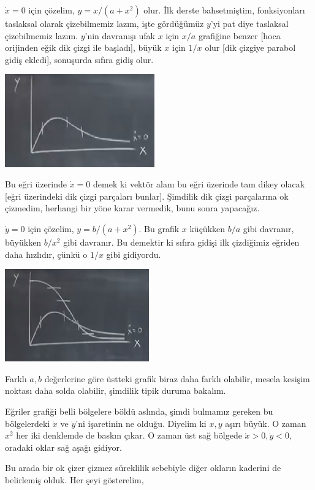 \documentclass[12pt,fleqn]{article}\usepackage{../../common}
\begin{document}
$\dot{x}=0$ için çözelim, $y = x / (a+x^2)$ olur. İlk derste bahsetmiştim,
fonksiyonları taslaksal olarak çizebilmemiz lazım, işte gördüğümüz $y$'yi pat
diye taslaksal çizebilmemiz lazım. $y$'nin davranışı ufak $x$ için $x/a$
grafiğine benzer [hoca orijinden eğik dik çizgi ile başladı], büyük $x$ için
$1/x$ olur [dik çizgiye parabol gidiş ekledi], sonuşurda sıfıra gidiş olur. 

\includegraphics[height=4cm]{09_12.png}

Bu eğri üzerinde $\dot{x}=0$ demek ki vektör alanı bu eğri üzerinde tam dikey
olacak [eğri üzerindeki dik çizgi parçaları bunlar]. Şimdilik dik çizgi
parçalarına ok çizmedim, herhangi bir yöne karar vermedik, bunu sonra
yapacağız.

$\dot{y}=0$ için çözelim, $y = b/(a+x^2)$. Bu grafik $x$ küçükken $b/a$ gibi
davranır, büyükken $b/x^2$ gibi davranır. Bu demektir ki sıfıra gidişi ilk
çizdiğimiz eğriden daha hızlıdır, çünkü o $1/x$ gibi gidiyordu. 

\includegraphics[height=4cm]{09_13.png}

Farklı $a,b$ değerlerine göre üstteki grafik biraz daha farklı olabilir, mesela
kesişim noktası daha solda olabilir, şimdilik tipik duruma bakalım. 

Eğriler grafiği belli bölgelere böldü aslında, şimdi bulmamız gereken bu
bölgelerdeki $\dot{x}$ ve $\dot{y}$'ni işaretinin ne olduğu. Diyelim ki $x,y$
aşırı büyük. O zaman $x^2$ her iki denklemde de baskın çıkar. O zaman üst sağ
bölgede $\dot{x}>0, \dot{y}<0$, oradaki oklar sağ aşağı gidiyor.

Bu arada bir ok çizer çizmez süreklilik sebebiyle diğer okların kaderini de
belirlemiş olduk. Her şeyi gösterelim,
\end{document}
